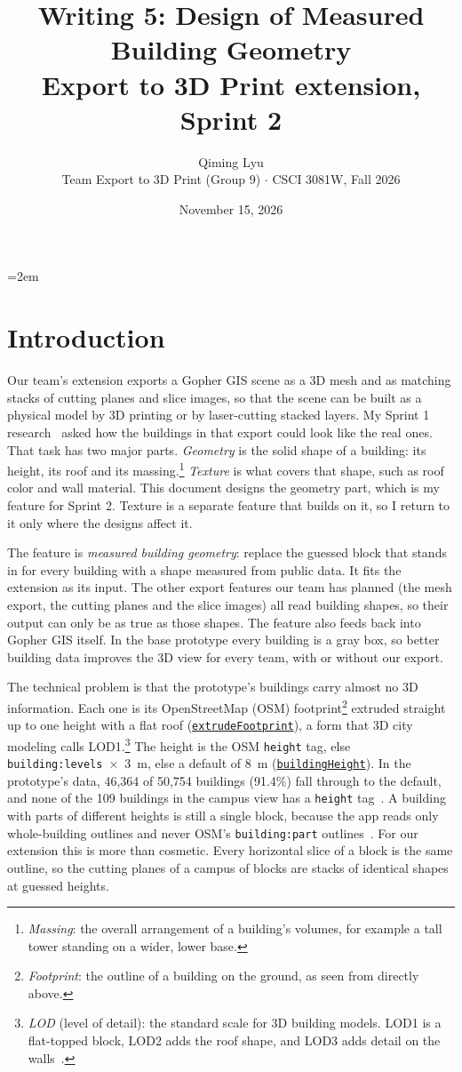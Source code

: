 \documentclass[11pt,letterpaper]{article}
\title{Writing 5: Design of Measured Building Geometry\\[0.3em]
  \large Export to 3D Print extension, Sprint 2}
\author{Qiming Lyu\\
  Team Export to 3D Print (Group 9) $\cdot$ CSCI 3081W, Fall 2026}
\date{November 15, 2026}
\newcommand{\repo}{https://github.com/csci-3081-20-f26/csci-3081-students-sprint-1-prototype-and-research-group-9}
\newcommand{\code}[2]{\href{\repo/blob/633898d5006ebe1ad46569516fb69f0e32bee508/#1}{\texttt{#2}}}
\begin{document}
\emergencystretch=2em
\maketitle

\section*{Introduction}

Our team's extension exports a Gopher GIS scene as a 3D mesh and as matching stacks of cutting planes and slice images, so that the scene can be built as a physical model by 3D printing or by laser-cutting stacked layers. My Sprint 1 research~\cite{research} asked how the buildings in that export could look like the real ones. That task has two major parts. \emph{Geometry} is the solid shape of a building: its height, its roof and its massing.\footnote{\emph{Massing}: the overall arrangement of a building's volumes, for example a tall tower standing on a wider, lower base.} \emph{Texture} is what covers that shape, such as roof color and wall material. This document designs the geometry part, which is my feature for Sprint 2. Texture is a separate feature that builds on it, so I return to it only where the designs affect it.

The feature is \emph{measured building geometry}: replace the guessed block that stands in for every building with a shape measured from public data. It fits the extension as its input. The other export features our team has planned (the mesh export, the cutting planes and the slice images) all read building shapes, so their output can only be as true as those shapes. The feature also feeds back into Gopher GIS itself. In the base prototype every building is a gray box, so better building data improves the 3D view for every team, with or without our export.

The technical problem is that the prototype's buildings carry almost no 3D information. Each one is its OpenStreetMap (OSM) footprint\footnote{\emph{Footprint}: the outline of a building on the ground, as seen from directly above.} extruded straight up to one height with a flat roof (\code{src/Buildings.cpp\#L357}{extrudeFootprint}), a form that 3D city modeling calls LOD1.\footnote{\emph{LOD} (level of detail): the standard scale for 3D building models. LOD1 is a flat-topped block, LOD2 adds the roof shape, and LOD3 adds detail on the walls~\cite{biljecki}.} The height is the OSM \texttt{height} tag, else \texttt{building:levels}~$\times$~3~m, else a default of 8~m (\code{src/Buildings.cpp\#L195}{buildingHeight}). In the prototype's data, 46,364 of 50,754 buildings (91.4\%) fall through to the default, and none of the 109 buildings in the campus view has a \texttt{height} tag~\cite{research}. A building with parts of different heights is still a single block, because the app reads only whole-building outlines and never OSM's \texttt{building:part} outlines~\cite{s3db}. For our extension this is more than cosmetic. Every horizontal slice of a block is the same outline, so the cutting planes of a campus of blocks are stacks of identical shapes at guessed heights.
\end{document}
